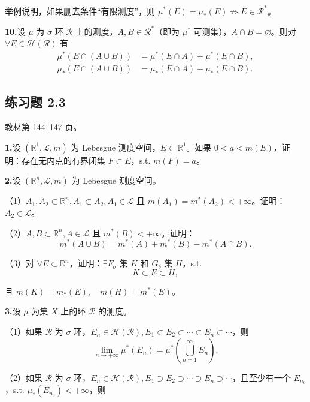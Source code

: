 \documentclass[11pt,a4paper]{article}
\begin{document}
\par\noindent 举例说明，如果删去条件“有限测度”，则 $\mu^*(E)=\mu_*(E)\not\Rightarrow E\in\mathcal R^*$。
\par{}\noindent\textbf{10.}\quad 设 $\mu$ 为 $\sigma$ 环 $\mathcal R$ 上的测度，$A,B\in\mathcal R^*$（即为 $\mu^*$ 可测集），$A\cap B=\varnothing$。则对 $\forall E\in\mathcal H(\mathcal R)$ 有
\[\begin{aligned}\mu^*(E\cap(A\cup B))&=\mu^*(E\cap A)+\mu^*(E\cap B),\\ \mu_*(E\cap(A\cup B))&=\mu_*(E\cap A)+\mu_*(E\cap B).\end{aligned}\]

\subsection*{练习题 2.3}
\noindent 教材第 144--147 页。
\par{}\noindent\textbf{1.}\quad 设 $(\mathbb R^1,\mathcal L,m)$ 为 Lebesgue 测度空间，$E\subset\mathbb R^1$。如果 $0<a<m(E)$，证明：存在无内点的有界闭集 $F\subset E$，s.t. $m(F)=a$。
\par{}\noindent\textbf{2.}\quad 设 $(\mathbb R^n,\mathcal L,m)$ 为 Lebesgue 测度空间。
\par\noindent （1）$A_1,A_2\subset\mathbb R^n,A_1\subset A_2,A_1\in\mathcal L$ 且 $m(A_1)=m^*(A_2)<+\infty$。证明：$A_2\in\mathcal L$。
\par\noindent （2）$A,B\subset\mathbb R^n,A\in\mathcal L$ 且 $m^*(B)<+\infty$。证明：
\[m^*(A\cup B)=m^*(A)+m^*(B)-m^*(A\cap B).\]
\par\noindent （3）对 $\forall E\subset\mathbb R^n$，证明：$\exists F_\sigma$ 集 $K$ 和 $G_\delta$ 集 $H$，s.t.
\[K\subset E\subset H,\]
\par\noindent 且 $m(K)=m_*(E),\quad m(H)=m^*(E)$。
\par{}\noindent\textbf{3.}\quad 设 $\mu$ 为集 $X$ 上的环 $\mathcal R$ 的测度。
\par\noindent （1）如果 $\mathcal R$ 为 $\sigma$ 环，$E_n\in\mathcal H(\mathcal R),E_1\subset E_2\subset\cdots\subset E_n\subset\cdots$，则
\[\lim_{n\to+\infty}\mu^*(E_n)=\mu^*\left(\bigcup_{n=1}^\infty E_n\right).\]
\par\noindent （2）如果 $\mathcal R$ 为 $\sigma$ 环，$E_n\in\mathcal H(\mathcal R),E_1\supset E_2\supset\cdots\supset E_n\supset\cdots$，且至少有一个 $E_{n_0}$，s.t. $\mu_*(E_{n_0})<+\infty$，则
\end{document}
